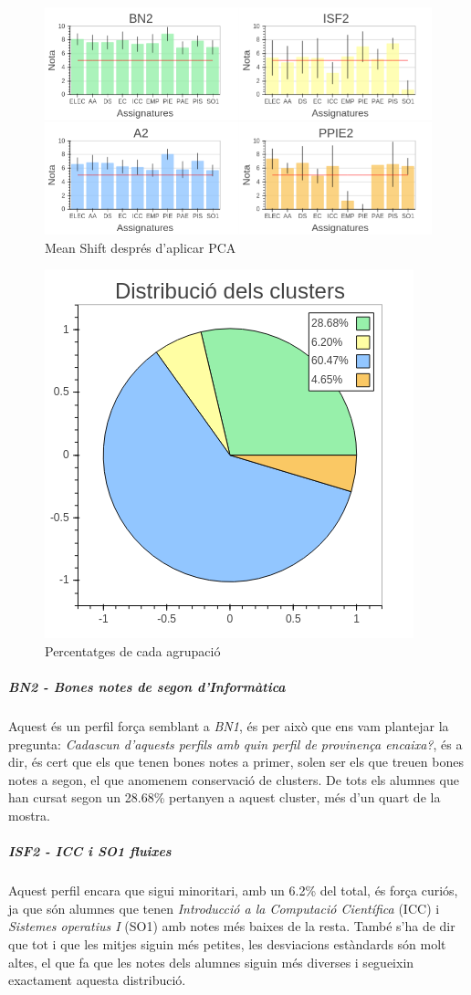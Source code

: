 \documentclass[12pt,a4paper,catalan]{article}
\begin{document}
\begin{figure}[h]
\centering
\includegraphics[width=.9\linewidth]{img/perfils_segon_info.png}
\caption{Mean Shift després d'aplicar PCA}
\end{figure}

\begin{figure}[h]
\centering
\includegraphics[width=.4\linewidth]{img/perfils_segon_info_pastilla.png}
\caption{Percentatges de cada agrupació}
\end{figure}

\subparagraph{BN2 - Bones notes de segon d'Informàtica}
Aquest és un perfil força semblant a \textit{BN1}, és per això que ens vam plantejar la pregunta: \textit{Cadascun d'aquests perfils amb quin perfil de provinença encaixa?}, és a dir, és cert que els que tenen bones notes a primer, solen ser els que treuen bones notes a segon, el que anomenem conservació de clusters. De tots els alumnes que han cursat segon un 28.68\% pertanyen a aquest cluster, més d'un quart de la mostra.

\subparagraph{ISF2 - ICC i SO1 fluixes}
Aquest perfil encara que sigui minoritari, amb un 6.2\% del total, és força curiós, ja que són alumnes que tenen \textit{Introducció a la Computació Científica} (ICC) i \textit{Sistemes operatius I} (SO1) amb notes més baixes de la resta. També s'ha de dir que tot i que les mitjes siguin més petites, les desviacions estàndards són molt altes, el que fa que les notes dels alumnes siguin més diverses i segueixin exactament aquesta distribució.
\end{document}
